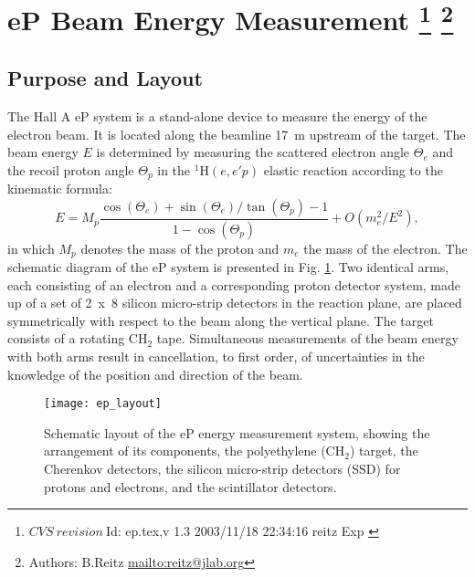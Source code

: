 \section[eP Beam Energy Measurement]{eP Beam Energy Measurement
\footnote{
  $CVS~revision~ $Id: ep.tex,v 1.3 2003/11/18 22:34:16 reitz Exp $ $
}
\footnote{Authors: B.Reitz \url{mailto:reitz@jlab.org}}
}
\label{sec:ep}
\subsection {Purpose and Layout}
\label{sec:ep_purpose}

The Hall A eP system is a stand-alone device to measure the 
energy of the electron beam. It is located along the beamline
17~m upstream of the target. The beam energy $E$ is determined by measuring
the scattered electron angle $\Theta_e$ and the recoil proton angle
$\Theta_p$ in the $^1$H$(e,e'p)$ elastic reaction according to the kinematic
formula:
\begin{equation}
E = M_p \frac{\cos(\Theta_e) + \sin(\Theta_e)/\tan(\Theta_p) - 1}{1 - \cos(\Theta_p)} + O(m_e^2/E^2),
\end{equation}
in which $M_p$ denotes the mass of the proton and $m_e$ the mass of the electron.
The schematic diagram of the eP system is presented in Fig. \ref{fig:ep_layout}. 
Two identical arms, each consisting of an electron and a corresponding proton 
detector system, made up of a set of 2~x~8 silicon micro-strip detectors in the
reaction plane, are placed symmetrically with respect to the beam along the 
vertical plane. The target consists of a rotating CH$_2$ tape.
Simultaneous measurements of the beam energy with both arms result
in cancellation, to first order, of uncertainties in the knowledge of the position
and direction of the beam. 
 \begin{figure}[htb]
    \begin{center}
        \texttt{[image: ep\_layout]}
    \end{center}
    \caption[eP: Layout]{
            Schematic layout of the eP energy measurement system,
            showing the arrangement of its components, the polyethylene (CH$_2$) 
            target, the Cherenkov detectors, the silicon micro-strip detectors (SSD) 
            for protons and electrons, and the scintillator detectors.
            }
    \label{fig:ep_layout} 
 \end{figure}  
\clearpage

